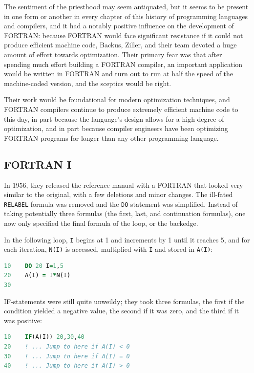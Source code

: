 The sentiment of the priesthood may seem antiquated, but it seems to be
present in one form or another in every chapter of this history of programming languages
and compilers, and it had a notably positive influence on the development of FORTRAN:
because FORTRAN would face significant resistance if it could not produce
efficient machine code, Backus, Ziller, and their team devoted a huge amount of
effort towards optimization.
Their primary fear was that after spending much effort building a FORTRAN
compiler, an important application would be written in FORTRAN and turn
out to run at half the speed of the machine-coded version, and the
sceptics would be right\cite{backus_heising_fortran_1964}.

Their work would be foundational for modern optimization techniques, and
FORTRAN compilers continue to produce extremely efficient machine code to
this day, in part because the language's design allows for a high degree of
optimization, and in part because compiler engineers have been optimizing
FORTRAN programs for longer than any other programming language.

\subsection{FORTRAN I}

In 1956, they released the reference manual  with a FORTRAN
that looked very similar to the original, with a few deletions and minor changes.
The ill-fated \texttt{RELABEL} formula was removed and the \texttt{DO} statement was simplified.
Instead of taking potentially three formulas (the first, last, and continuation formulas),
one now only specified the final formula of the loop, or the \gls{backedge}.

In the following loop, \texttt{I} begins at 1 and increments by 1 until it reaches 5, and for
each iteration, \texttt{N(I)} is accessed, multiplied with \texttt{I} and stored in \texttt{A(I)}:

\begin{lstlisting}[language=Fortran,frame=single]
10    DO 20 I=1,5
20    A(I) = I*N(I)
30
\end{lstlisting}

IF-statements were still quite unweildy; they took three formulas, the first if the
condition yielded a negative value, the second if it was zero, and the third if it was positive:

\begin{lstlisting}[language=Fortran,frame=single]
10    IF(A(I)) 20,30,40
20    ! ... Jump to here if A(I) < 0
30    ! ... Jump to here if A(I) = 0
40    ! ... Jump to here if A(I) > 0
\end{lstlisting}

